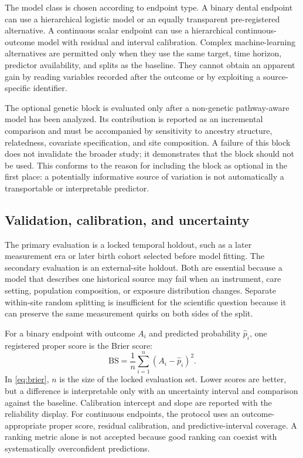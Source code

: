 \documentclass[conference]{IEEEtran}
\begin{document}
The model class is chosen according to endpoint type. A binary dental
endpoint can use a hierarchical logistic model or an equally transparent
pre-registered alternative. A continuous scalar endpoint can use a
hierarchical continuous-outcome model with residual and interval calibration.
Complex machine-learning alternatives are permitted only when they use the
same target, time horizon, predictor availability, and splits as the
baseline. They cannot obtain an apparent gain by reading variables recorded
after the outcome or by exploiting a source-specific identifier.

The optional genetic block is evaluated only after a non-genetic
pathway-aware model has been analyzed. Its contribution is reported as an
incremental comparison and must be accompanied by sensitivity to ancestry
structure, relatedness, covariate specification, and site composition. A
failure of this block does not invalidate the broader study; it demonstrates
that the block should not be used. This conforms to the reason for including
the block as optional in the first place: a potentially informative source of
variation is not automatically a transportable or interpretable predictor.

\subsection{Validation, calibration, and uncertainty}

The primary evaluation is a locked temporal holdout, such as a later
measurement era or later birth cohort selected before model fitting. The
secondary evaluation is an external-site holdout. Both are essential because
a model that describes one historical source may fail when an instrument,
care setting, population composition, or exposure distribution changes.
Separate within-site random splitting is insufficient for the scientific
question because it can preserve the same measurement quirks on both sides of
the split.

For a binary endpoint with outcome $A_i$ and predicted probability
$\widehat{p}_i$, one registered proper score is the Brier score:
\begin{equation}
\mathrm{BS}=\frac{1}{n}\sum_{i=1}^{n}(A_i-\widehat{p}_i)^2.
\label{eq:brier}
\end{equation}
In \eqref{eq:brier}, $n$ is the size of the locked evaluation set. Lower
scores are better, but a difference is interpretable only with an uncertainty
interval and comparison against the baseline. Calibration intercept and slope
are reported with the reliability display. For continuous endpoints, the
protocol uses an outcome-appropriate proper score, residual calibration, and
predictive-interval coverage. A ranking metric alone is not accepted because
good ranking can coexist with systematically overconfident predictions.
\end{document}

